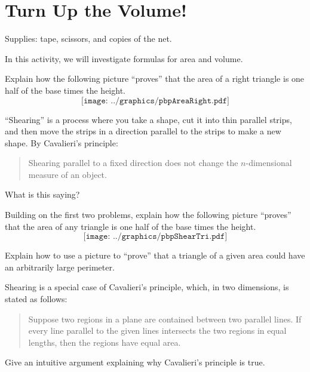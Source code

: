 \newpage
\section{Turn Up the Volume!}
\begin{teachingnote}
Supplies: tape, scissors, and copies of the net.
\end{teachingnote}
In this activity, we will investigate formulas for area and
volume.


\begin{prob}
Explain how the following picture ``proves'' that the area of a right
  triangle is one half of the base times the height.
\[
\texttt{[image: ../graphics/pbpAreaRight.pdf]}
\]
\end{prob}

\begin{prob}
``Shearing'' is a process where you take a shape, cut it into thin parallel strips, 
and then move the strips in a direction parallel to the strips to make a new shape.  
By Cavalieri's principle:
\begin{quote}
Shearing parallel to a fixed direction does not change the $n$-dimensional measure of an object.
\end{quote}
What is this saying?
\end{prob}

\begin{prob}
Building on the first two problems, explain how the following picture
  ``proves'' that the area of any triangle is one half of the base times the
  height.
\[
\texttt{[image: ../graphics/pbpShearTri.pdf]}
\]
\end{prob}

\begin{prob}
Explain how to use a picture to ``prove'' that a triangle of a given
  area could have an arbitrarily large perimeter.
\end{prob}
\vspace{.25in}

\begin{prob}
Shearing is a special case of Cavalieri's principle, which, in two dimensions, is stated as follows:  
\begin{quote}
Suppose two regions in a plane are contained between two parallel lines.  If every line parallel to the given lines intersects the two regions in equal lengths, then the regions have equal area.  
\end{quote}
Give an intuitive argument explaining why Cavalieri's principle is true.
\end{prob}

